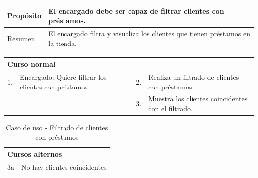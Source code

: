 \begin{table}[H]
	\centering
	\begin{tabular}{| m{} | m{} | m{} | m{} |}
		\hline
		Propósito & \multicolumn{3}{m{0.67\textwidth}|}{El encargado debe ser capaz de filtrar clientes con préstamos.}  \\ 
		\hline
		Resumen & \multicolumn{3}{m{0.67\textwidth}|}{El encargado filtra y visualiza los clientes que tienen préstamos en la tienda.} \\ 
		\hline
	\end{tabular}
\end{table}


\begin{table}[H]
	\centering
	\begin{tabular}{| m{} | m{} | m{} | m{} |}
		\hline
		\multicolumn{4}{|m{0.9\textwidth}|}{Curso normal}     \\ 
		\hline
		1. & Encargado: Quiere filtrar los clientes con préstamos. & 2. &  Realiza un filtrado de clientes con préstamos.  \\ 
		\hline
		&  & 3. &  Muestra los clientes coincidentes con el filtrado.  \\ 
		\hline
	\end{tabular}
\end{table}

\begin{table}[H]
	\centering
	\begin{tabular}{| m{} | m{} | m{} | m{} |}
		\hline
		\multicolumn{4}{|m{0.9\textwidth}|}{Cursos alternos}     \\ 
		\hline
		3a & \multicolumn{3}{m{0.67\textwidth}|}{No hay clientes coincidentes} \\ 
		\hline
	\end{tabular}
	\caption{Caso de uso - Filtrado de clientes con préstamos}
\end{table}

\newpage


